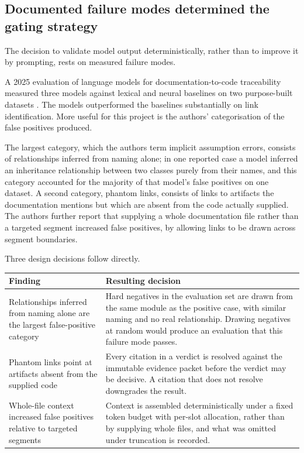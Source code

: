 \subsection{Documented failure modes determined the gating strategy}

The decision to validate model output deterministically, rather than to improve
it by prompting, rests on measured failure modes.

A 2025 evaluation of language models for documentation-to-code traceability
measured three models against lexical and neural baselines on two purpose-built
datasets \cite{alor2025}. The models outperformed the baselines substantially on
link identification. More useful for this project is the authors'
categorisation of the false positives produced.

The largest category, which the authors term implicit assumption errors,
consists of relationships inferred from naming alone; in one reported case a
model inferred an inheritance relationship between two classes purely from their
names, and this category accounted for the majority of that model's false
positives on one dataset. A second category, phantom links, consists of links to
artifacts the documentation mentions but which are absent from the code actually
supplied. The authors further report that supplying a whole documentation file
rather than a targeted segment increased false positives, by allowing links to
be drawn across segment boundaries.

Three design decisions follow directly.

\begin{longtable}{>{\raggedright\arraybackslash}p{}>{\raggedright\arraybackslash}p{}}
\toprule
Finding & Resulting decision \\
\midrule
\endhead
Relationships inferred from naming alone are the largest false-positive category
  & Hard negatives in the evaluation set are drawn from the same module as the
    positive case, with similar naming and no real relationship. Drawing
    negatives at random would produce an evaluation that this failure mode
    passes. \\
Phantom links point at artifacts absent from the supplied code
  & Every citation in a verdict is resolved against the immutable evidence
    packet before the verdict may be decisive. A citation that does not resolve
    downgrades the result. \\
Whole-file context increased false positives relative to targeted segments
  & Context is assembled deterministically under a fixed token budget with
    per-slot allocation, rather than by supplying whole files, and what was
    omitted under truncation is recorded. \\
\bottomrule
\end{longtable}

